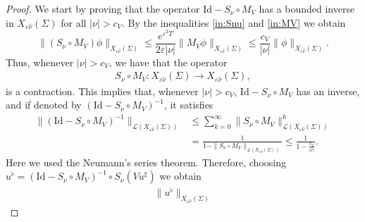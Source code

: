 \documentclass[10pt,a4paper]{amsart}
\theoremstyle{remark}
\theoremstyle{definition}
\newcommand{\R}{\mathbb{R}}
\newcommand{\tm}{\mathrm{t}}
\newcommand{\x}{\mathrm{x}}
\newcommand{\Id}{\mathrm{Id}}
\begin{document}
\begin{proof}
    We start by proving that the operator $\Id - S_\nu \circ M_V$
    has a bounded inverse in $X_{\varepsilon \hat{\nu}} (\Sigma)$ for all $|\nu| > c_V$.
By the inequalities \eqref{in:Snu} and \eqref{in:MV} we obtain
    \begin{equation*}
      \| (S_\nu \circ M_V) \phi\|_{X_{\varepsilon \hat{\nu}}(\Sigma)} \leq \frac{e^{\varepsilon^2 T}}{ 2 \varepsilon |\nu|} \|  M_V \phi\|_{X_{\varepsilon \hat{\nu}}(\Sigma)} 
      \leq \frac{c_V}{  |\nu|}  \| \phi\|_{X_{\varepsilon \hat{\nu}}(\Sigma)}.
    \end{equation*}
   Thus, whenever $|\nu|> c_V$, we have that the operator 
       \begin{align*}
   S_\nu \circ M_V:X_{\varepsilon \hat{\nu}}(\Sigma) \longrightarrow   X_{\varepsilon \hat{\nu}}(\Sigma), 
    \end{align*}
    is a contraction. This implies that, whenever $|\nu|> c_V$, $\Id - S_\nu \circ M_V$ has an inverse, and if denoted by $(\Id - S_\nu \circ M_V)^{-1}$, it satisfies
    \begin{align*}
       \| (\Id - S_\nu \circ M_V)^{-1}\|_{\mathcal{L}(X_{\varepsilon \hat{\nu}}(\Sigma))} & \leq \sum_{k=0}^\infty \|S_{\nu} \circ M_{V}\|_{\mathcal{L}(X_{\varepsilon \hat{\nu}}(\Sigma))}^k \\ 
       & = \frac{1}{1-\|S_{\nu} \circ M_{V}\|_{\mathcal{L}(X_{\varepsilon \hat{\nu}}(\Sigma))}} \leq \frac{1}{1-\frac{c_V}{  |\nu|}}.
    \end{align*}
    Here we used the Neumann's series theorem. Therefore, choosing
    $ u^\flat = (\Id - S_\nu \circ M_V)^{-1} \circ S_\nu (V u^\sharp) $
     we obtain
       \begin{align*}
 \| u^\flat \|_{X_{\varepsilon \hat{\nu}}(\Sigma)}

\end{align*}
\end{proof}
\end{document}
